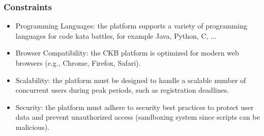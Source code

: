 \subsubsection{Constraints}
\begin{itemize}
    \item Programming Languages: the platform supports a variety of programming languages for code kata battles, for example Java, Python, C, ...
    \item Browser Compatibility: the CKB platform is optimized for modern web browsers (e.g., Chrome, Firefox, Safari).
    \item Scalability: the platform must be designed to handle a scalable number of concurrent users during peak periods, such as registration deadlines.
     \item Security: the platform must adhere to security best practices to protect user data and prevent unauthorized access (sandboxing system since scripts can be malicious).
\end{itemize}